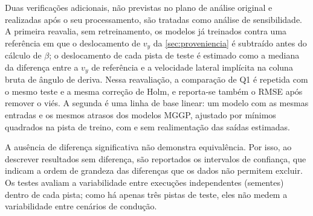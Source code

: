 Duas verificações adicionais, não previstas no plano de análise original e realizadas após o seu processamento, são tratadas como análise de sensibilidade. A primeira reavalia, sem retreinamento, os modelos já treinados contra uma referência em que o deslocamento de $v_y$ da \autoref{sec:proveniencia} é subtraído antes do cálculo de $\beta$; o deslocamento de cada pista de teste é estimado como a mediana da diferença entre a $v_y$ de referência e a velocidade lateral implícita na coluna bruta de ângulo de deriva. Nessa reavaliação, a comparação de Q1 é repetida com o mesmo teste e a mesma correção de Holm, e reporta-se também o RMSE após remover o viés. A segunda é uma linha de base linear: um modelo com as mesmas entradas e os mesmos atrasos dos modelos MGGP, ajustado por mínimos quadrados na pista de treino, com e sem realimentação das saídas estimadas.

A ausência de diferença significativa não demonstra equivalência. Por isso, ao descrever resultados sem diferença, são reportados os intervalos de confiança, que indicam a ordem de grandeza das diferenças que os dados não permitem excluir. Os testes avaliam a variabilidade entre execuções independentes (sementes) dentro de cada pista; como há apenas três pistas de teste, eles não medem a variabilidade entre cenários de condução.
